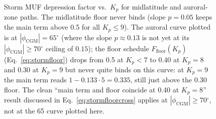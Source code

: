 \documentclass[11pt,a4paper]{article}
\newcommand{\degree}{\ensuremath{{}^\circ}}
\begin{document}
\begin{figure}[H]
\centering
{}
\caption{Storm MUF depression factor vs.\ $K_p$ for midlatitude and
         auroral-zone paths.  The midlatitude floor never binds (slope
         $p=0.05$ keeps the main term above 0.5 for all $K_p \le 9$).
         The auroral curve plotted is at $|\phi_{\text{CGM}}| =
         65\degree$ (where the slope $p \approx 0.13$ is not yet at
         its $|\phi_{\text{CGM}}| \ge 70\degree$ ceiling of $0.15$);
         the floor schedule
         $F_{\text{floor}}(K_p)$ (Eq.~\ref{eq:stormfloor})
         drops from 0.5 at $K_p < 7$ to 0.40 at $K_p=8$ and 0.30
         at $K_p=9$ but never quite binds on this curve: at
         $K_p = 9$ the main term reads $1 - 0.133 \cdot 5 =
         0.335$, still just above the $0.30$ floor.  The clean ``main term and floor
         coincide at 0.40 at $K_p = 8$'' result discussed in
         Eq.~\ref{eq:stormfloorcross} applies at
         $|\phi_{\text{CGM}}| \ge 70\degree$, not at the
         65\textdegree{} curve plotted here.}
\label{fig:storm}
\end{figure}
\end{document}
